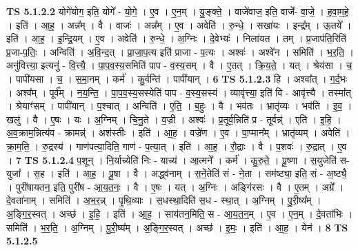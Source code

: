 \documentclass[17pt]{extarticle}
\begin{document}
                                \textbf{ TS 5.1.2.2} \newline
                  योगे॑योग॒ इति॒ योगे᳚ - यो॒गे॒ । ए॒व । ए॒न॒म् । यु॒ङ्क्ते॒ । वाजे॑वाज॒ इति॒ वाजे᳚- वा॒जे॒ । ह॒वा॒म॒हे॒ । इति॑ । आ॒ह॒ । अन्न᳚म् । वै । वाजः॑ । अन्न᳚म् । ए॒व । अवेति॑ । रु॒न्धे॒ । सखा॑यः । इन्द्र᳚म् । ऊ॒तये᳚ । इति॑ । आ॒ह॒ । इ॒न्द्रि॒यम् । ए॒व । अवेति॑ । रु॒न्धे॒ । अ॒ग्निः । दे॒वेभ्यः॑ । निला॑यत । तम् । प्र॒जाप॑ति॒रिति॑ प्र॒जा-प॒तिः॒ । अन्विति॑ । अ॒वि॒न्द॒त् । प्रा॒जा॒प॒त्य इति॑ प्राजा - प॒त्यः । अश्वः॑ । अश्वे॑न । समिति॑ । भ॒र॒ति॒ । अनु॑वित्त्या॒ इत्यनु॑ - वि॒त्त्यै॒ । पा॒प॒व॒स्य॒समिति॑ पाप - व॒स्य॒सम् । वै । ए॒तत् । क्रि॒य॒ते॒ । यत् । श्रेय॑सा । च॒ । पापी॑यसा । च॒ । स॒मा॒नम् । कर्म॑ । कु॒र्वन्ति॑ । पापी॑यान् । \textbf{  6} \newline
                  \newline
                                \textbf{ TS 5.1.2.3} \newline
                  हि । अश्वा᳚त् । ग॒र्द॒भः । अश्व᳚म् । पूर्व᳚म् । न॒य॒न्ति॒ । पा॒प॒व॒स्य॒सस्येति॑ पाप - व॒स्य॒सस्य॑ । व्यावृ॑त्त्या॒ इति॑ वि - आवृ॑त्त्यै । तस्मा᳚त् । श्रेयाꣳ॑सम् । पापी॑यान् । प॒श्चात् । अन्विति॑ । ए॒ति॒ । ब॒हुः । वै । भव॑तः । भ्रातृ॑व्यः । भव॑ति । इ॒व॒ । खलु॑ । वै । ए॒षः । यः । अ॒ग्निम् । चि॒नु॒ते । व॒ज्री । अश्वः॑ । प्र॒तूर्व॒न्निति॑ प्र - तूर्वन्न्॑ । एति॑ । इ॒हि॒ । अ॒व॒क्राम॒न्नित्य॑व - क्रामन्न्॑ । अश॑स्तीः । इति॑ । आ॒ह॒ । वज्रे॑ण । ए॒व । पा॒प्मान᳚म् । भ्रातृ॑व्यम् । अवेति॑ । क्रा॒म॒ति॒ । रु॒द्रस्य॑ । गाण॑पत्या॒दिति॒ गाण॑ - प॒त्या॒त् । इति॑ । आ॒ह॒ । रौ॒द्राः । वै । प॒शवः॑ । रु॒द्रात् । ए॒व । \textbf{  7 } \newline
                  \newline
                                \textbf{ TS 5.1.2.4} \newline
                  प॒शून् । नि॒र्याच्येति॑ निः - याच्य॑ । आ॒त्मने᳚ । कर्म॑ । कु॒रु॒ते॒ । पू॒ष्णा । स॒युजेति॑ स-युजा᳚ । स॒ह । इति॑ । आ॒ह॒ । पू॒षा । वै । अद्ध्व॑नाम् । स॒नें॒तेति॑ सं - ने॒ता । सम॑ष्ट्या॒ इति॒ सं - अ॒ष्ट्यै॒ । पुरी॑षायतन॒ इति॒ पुरी॑ष - आ॒य॒त॒नः॒ । वै । ए॒षः । यत् । अ॒ग्निः । अङ्गि॑रसः । वै । ए॒तम् । अग्रे᳚ । दे॒वता॑नाम् । समिति॑ । अ॒भ॒र॒न्न् । पृ॒थि॒व्याः । स॒धस्था॒दिति॑ स॒ध - स्था॒त् । अ॒ग्निम् । पु॒री॒ष्य᳚म् । अ॒ङ्गि॒र॒स्वत् । अच्छ॑ । इ॒हि॒ । इति॑ । आ॒ह॒ । साय॑तन॒मिति॒ स - आ॒य॒त॒न॒म् । ए॒व । ए॒न॒म् । दे॒वता॑भिः । समिति॑ । भ॒र॒ति॒ । अ॒ग्निम् । पु॒री॒ष्य᳚म् । अ॒ङ्गि॒र॒स्वत् । अच्छ॑ । इ॒मः॒ । इति॑ । आ॒ह॒ । येन॑ । \textbf{  8} \newline
                  \newline
                                \textbf{ TS 5.1.2.5} \newline
\end{document}
